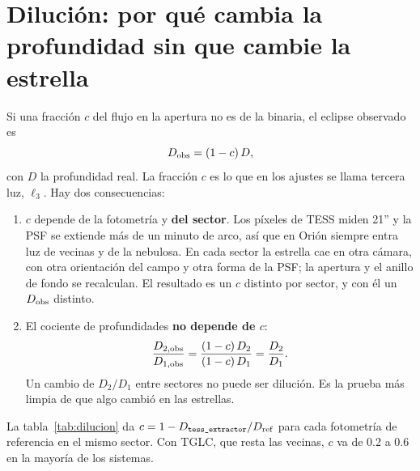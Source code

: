 \documentclass[11pt,a4paper]{article}
\newcommand{\tx}{\texttt{tess\_extractor}}
\newcommand{\Dum}{D_2/D_1}
\begin{document}
\section{Dilución: por qué cambia la profundidad sin que cambie la estrella}
\label{sec:dilucion}
Si una fracción $c$ del flujo en la apertura no es de la binaria, el eclipse observado es
\begin{equation}
D_{\rm obs}=(1-c)\,D,
\label{eq:dilucion}
\end{equation}
con $D$ la profundidad real. La fracción $c$ es lo que en los ajustes se llama tercera luz, $\ell_3$.
Hay dos consecuencias:
\begin{enumerate}
\item $c$ depende de la fotometría y \textbf{del sector}. Los píxeles de TESS miden 21'' y la PSF se
  extiende más de un minuto de arco, así que en Orión siempre entra luz de vecinas y de la nebulosa. En
  cada sector la estrella cae en otra cámara, con otra orientación del campo y otra forma de la PSF; la
  apertura y el anillo de fondo se recalculan. El resultado es un $c$ distinto por sector, y con él un
  $D_{\rm obs}$ distinto.
\item El cociente de profundidades \textbf{no depende de $c$}:
\begin{equation}
\frac{D_{2,\rm obs}}{D_{1,\rm obs}}=\frac{(1-c)\,D_2}{(1-c)\,D_1}=\frac{D_2}{D_1}.
\end{equation}
  Un cambio de $\Dum$ entre sectores no puede ser dilución. Es la prueba más limpia de que algo
  cambió en las estrellas.
\end{enumerate}

La tabla~\ref{tab:dilucion} da $c=1-D_{\tx}/D_{\rm ref}$ para cada fotometría de referencia en el mismo
sector. Con TGLC, que resta las vecinas, $c$ va de 0.2 a 0.6 en la mayoría de los sistemas.
\end{document}
